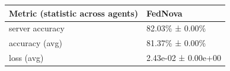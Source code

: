 \begin{tabular}{ll}
\hline
 Metric (statistic across agents)   & FedNova             \\
\hline
 server accuracy                    & 82.03\% ± 0.00\%      \\
 accuracy (avg)                     & 81.37\% ± 0.00\%      \\
 loss (avg)                         & 2.43e-02 ± 0.00e+00 \\
\hline
\end{tabular}